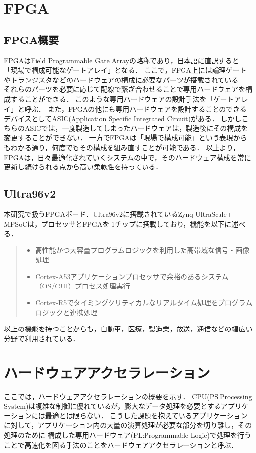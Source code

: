 \documentclass[11pt,a4j]{jreport}
\begin{document}
\section{FPGA}
\subsection{FPGA概要}
FPGAはField Programmable Gate Arrayの略称であり，日本語に直訳すると「現場で構成可能なゲートアレイ」となる．
ここで，FPGA上には論理ゲートやトランジスタなどのハードウェアの構成に必要なパーツが搭載されている．
それらのパーツを必要に応じて配線で繋ぎ合わせることで専用ハードウェアを構成することができる．
このような専用ハードウェアの設計手法を「ゲートアレイ」と呼ぶ．
また，FPGAの他にも専用ハードウェアを設計することのできるデバイスとしてASIC(Application Specific Integrated Circuit)がある．
しかしこちらのASICでは，一度製造してしまったハードウェアは，製造後にその構成を変更することができない．
一方でFPGAは「現場で構成可能」という表現からもわかる通り，何度でもその構成を組み直すことが可能である．
以上より，FPGAは，日々最適化されていくシステムの中で，そのハードウェア構成を常に更新し続けられる点から高い柔軟性を持っている．

\subsection{Ultra96v2}
本研究で扱うFPGAボード．Ultra96v2に搭載されているZynq UltraScale+ MPSoC\cite{boardinfo}は，プロセッサとFPGAを
1チップに搭載しており，機能を以下に述べる．
\begin{quote}
  \begin{itemize}
    \item 高性能かつ大容量プログラムロジックを利用した高帯域な信号・画像処理
    \item Cortex-A53アプリケーションプロセッサで余裕のあるシステム（OS/GUI）プロセス処理実行
    \item Cortex-R5でタイミングクリティカルなリアルタイム処理をプログラムロジックと連携処理
  \end{itemize}
\end{quote}
以上の機能を持つことからも，自動車，医療，製造業，放送，通信などの幅広い分野で利用されている．

\section{ハードウェアアクセラレーション}
ここでは，ハードウェアアクセラレーション\cite{HWAccel}の概要を示す．
CPU(PS:Processing System)は複雑な制御に優れているが，膨大なデータ処理を必要とするアプリケーションには最適とは限らない．
こうした課題を抱えているアプリケーションに対して，アプリケーション内の大量の演算処理が必要な部分を切り離し，その処理のために
構成した専用ハードウェア(PL:Programmable Logic)で処理を行うことで高速化を図る手法のことをハードウェアアクセラレーションと呼ぶ．
\end{document}
